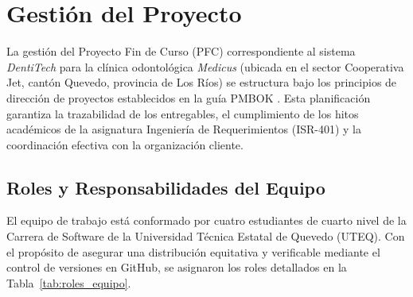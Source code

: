 \section{Gesti{\'o}n del Proyecto}

La gesti{\'o}n del Proyecto Fin de Curso (PFC) correspondiente al sistema \textit{DentiTech} para la cl{\'i}nica odontol{\'o}gica \textit{Medicus} (ubicada en el sector Cooperativa Jet, cant{\'o}n Quevedo, provincia de Los R{\'i}os) se estructura bajo los principios de direcci{\'o}n de proyectos establecidos en la gu{\'i}a PMBOK \cite{pmbok2021}. Esta planificaci{\'o}n garantiza la trazabilidad de los entregables, el cumplimiento de los hitos acad{\'e}micos de la asignatura Ingenier{\'i}a de Requerimientos (ISR-401) y la coordinaci{\'o}n efectiva con la organizaci{\'o}n cliente.

\subsection{Roles y Responsabilidades del Equipo}

El equipo de trabajo est{\'a} conformado por cuatro estudiantes de cuarto nivel de la Carrera de Software de la Universidad T{\'e}cnica Estatal de Quevedo (UTEQ). Con el prop{\'o}sito de asegurar una distribuci{\'o}n equitativa y verificable mediante el control de versiones en GitHub, se asignaron los roles detallados en la Tabla~\ref{tab:roles_equipo}.

